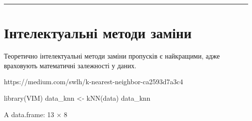 \documentclass[
  letterpaper,
  DIV=11,
  numbers=noendperiod]{scrreprt}
\newenvironment{Shaded}{\begin{snugshade}}{\end{snugshade}}
\newcommand{\FunctionTok}[1]{\textcolor[rgb]{0.28,0.35,0.67}{#1}}
\newcommand{\NormalTok}[1]{\textcolor[rgb]{0.00,0.23,0.31}{#1}}
\newcommand{\OtherTok}[1]{\textcolor[rgb]{0.00,0.23,0.31}{#1}}
\begin{document}
\begin{center}\rule{0.5\linewidth}{0.5pt}\end{center}

\section{Інтелектуальні методи
заміни}\label{ux456ux43dux442ux435ux43bux435ux43aux442ux443ux430ux43bux44cux43dux456-ux43cux435ux442ux43eux434ux438-ux437ux430ux43cux456ux43dux438}

Теоретично інтелектуальні методи заміни пропусків є найкращими, адже
враховують математичні залежності у даних.

https://medium.com/swlh/k-nearest-neighbor-ca2593d7a3c4

\begin{Shaded}
\begin{Highlighting}[]
\FunctionTok{library}\NormalTok{(VIM)}
\NormalTok{data\_knn }\OtherTok{\textless{}{-}} \FunctionTok{kNN}\NormalTok{(data)}
\NormalTok{data\_knn}
\end{Highlighting}
\end{Shaded}

A data.frame: 13 × 8
\end{document}
